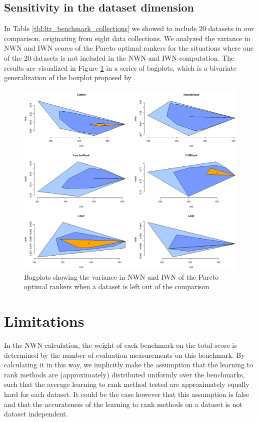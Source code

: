 \documentclass[english, authoryear, preprint]{elsarticle}
\begin{document}
\subsection{Sensitivity in the dataset dimension}
\label{subsec:sensitivity_data_set}
In Table \ref{tbl:ltr_benchmark_collections} we showed to include 20 datasets in our comparison, originating from eight data collections. We analyzed the variance in NWN and IWN scores of the Pareto optimal rankers for the situations where one of the 20 datasets is not included in the NWN and IWN computation. The results are visualized in Figure \ref{fig:sensitivity_data_set} in a series of bagplots, which is a bivariate generalization of the boxplot proposed by \cite{Rousseeuw1999}.
\begin{figure}[!h]
	\centering
	\includegraphics[scale=0.5]{gfx/bagplots}
	\caption{Bagplots showing the variance in NWN and IWN of the Pareto optimal rankers when a dataset is left out of the comparison}
	\label{fig:sensitivity_data_set}
\end{figure}

\section{Limitations}
In the NWN calculation, the weight of each benchmark on the total score is determined by the number of evaluation measurements on this benchmark. By calculating it in this way, we implicitly make the assumption that the learning to rank methods are (approximately) distributed uniformly over the benchmarks, such that the average learning to rank method tested are approximately equally hard for each dataset. It could be the case however that this assumption is false and that the accurateness of the learning to rank methods on a dataset is not dataset independent.\\
\end{document}
